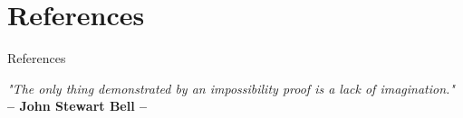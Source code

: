 \documentclass[9pt, handout, aspectratio=169]{beamer}		%
\begin{document}
\section{References}
	\begin{frame}{References}

		\begin{thebibliography}{9}

		\end{thebibliography}

		\vspace{20pt}
		\begin{small}
		\begin{center}{
		\color{gray}
			\emph{"The only thing demonstrated by an impossibility proof is a lack of imagination."} \\
			\textbf{– John Stewart Bell –} }
		\end{center}
		\end{small}
	\end{frame}

\FinalFrame
\end{document}
